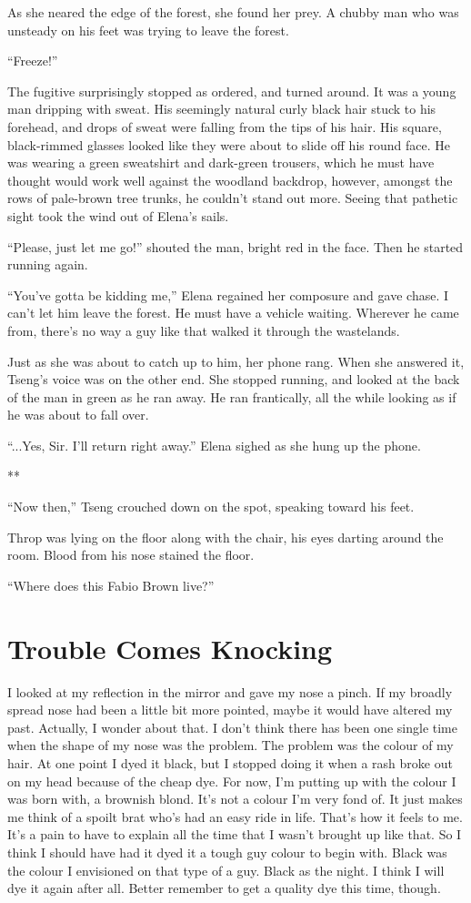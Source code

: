 \documentclass[oneside]{book}
\begin{document}
As she neared the edge of the forest, she found her prey. A chubby man who was unsteady on his feet was trying to leave the forest.

“Freeze!”

The fugitive surprisingly stopped as ordered, and turned around. It was a young man dripping with sweat. His seemingly natural curly black hair stuck to his forehead, and drops of sweat were falling from the tips of his hair. His square, black-rimmed glasses looked like they were about to slide off his round face. He was wearing a green sweatshirt and dark-green trousers, which he must have thought would work well against the woodland backdrop, however, amongst the rows of pale-brown tree trunks, he couldn’t stand out more. Seeing that pathetic sight took the wind out of Elena’s sails.

“Please, just let me go!” shouted the man, bright red in the face. Then he started running again.

“You’ve gotta be kidding me,” Elena regained her composure and gave chase. I can’t let him leave the forest. He must have a vehicle waiting. Wherever he came from, there’s no way a guy like that walked it through the wastelands.

Just as she was about to catch up to him, her phone rang. When she answered it, Tseng’s voice was on the other end. She stopped running, and looked at the back of the man in green as he ran away. He ran frantically, all the while looking as if he was about to fall over.

“...Yes, Sir. I’ll return right away.” Elena sighed as she hung up the phone.

**

“Now then,” Tseng crouched down on the spot, speaking toward his feet.

Throp was lying on the floor along with the chair, his eyes darting around the room. Blood from his nose stained the floor.

“Where does this Fabio Brown live?”

\chapter{Trouble Comes Knocking}
I looked at my reflection in the mirror and gave my nose a pinch. If my broadly spread nose had been a little bit more pointed, maybe it would have altered my past. Actually, I wonder about that. I don’t think there has been one single time when the shape of my nose was the problem. The problem was the colour of my hair. At one point I dyed it black, but I stopped doing it when a rash broke out on my head because of the cheap dye. For now, I’m putting up with the colour I was born with, a brownish blond. It’s not a colour I’m very fond of. It just makes me think of a spoilt brat who’s had an easy ride in life. That’s how it feels to me. It’s a pain to have to explain all the time that I wasn’t brought up like that. So I think I should have had it dyed it a tough guy colour to begin with. Black was the colour I envisioned on that type of a guy. Black as the night. I think I will dye it again after all. Better remember to get a quality dye this time, though.
\end{document}
